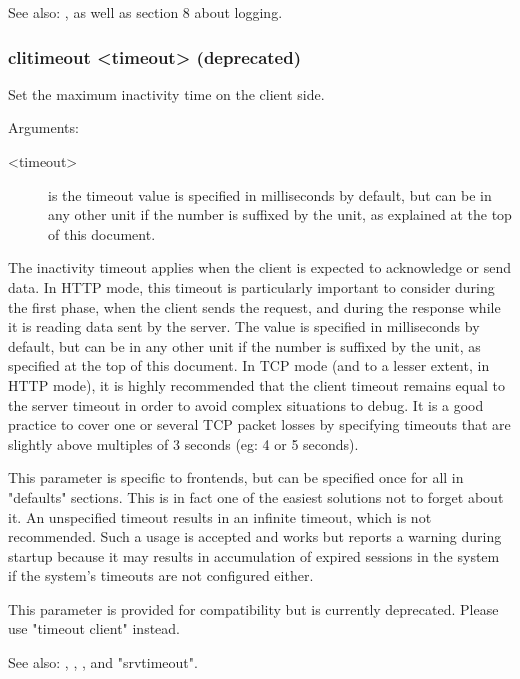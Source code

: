   See also: ,  as well as section 8
             about logging.

\subsubsection[clitimeout]{clitimeout <timeout> (deprecated)}
  Set the maximum inactivity time on the client side.
  
  
  Arguments:
  \begin{description}
  \item[<timeout>] is the timeout value is specified in milliseconds by default, but
              can be in any other unit if the number is suffixed by the unit,
              as explained at the top of this document.  
  \end{description}

  The inactivity timeout applies when the client is expected to acknowledge or
  send data. In HTTP mode, this timeout is particularly important to consider
  during the first phase, when the client sends the request, and during the
  response while it is reading data sent by the server. The value is specified
  in milliseconds by default, but can be in any other unit if the number is
  suffixed by the unit, as specified at the top of this document. In TCP mode
  (and to a lesser extent, in HTTP mode), it is highly recommended that the
  client timeout remains equal to the server timeout in order to avoid complex
  situations to debug. It is a good practice to cover one or several TCP packet
  losses by specifying timeouts that are slightly above multiples of 3 seconds
  (eg: 4 or 5 seconds).

  This parameter is specific to frontends, but can be specified once for all in
  "defaults" sections. This is in fact one of the easiest solutions not to
  forget about it. An unspecified timeout results in an infinite timeout, which
  is not recommended. Such a usage is accepted and works but reports a warning
  during startup because it may results in accumulation of expired sessions in
  the system if the system's timeouts are not configured either.

  This parameter is provided for compatibility but is currently deprecated.
  Please use "timeout client" instead.

  See also: , , , and
             "srvtimeout".

